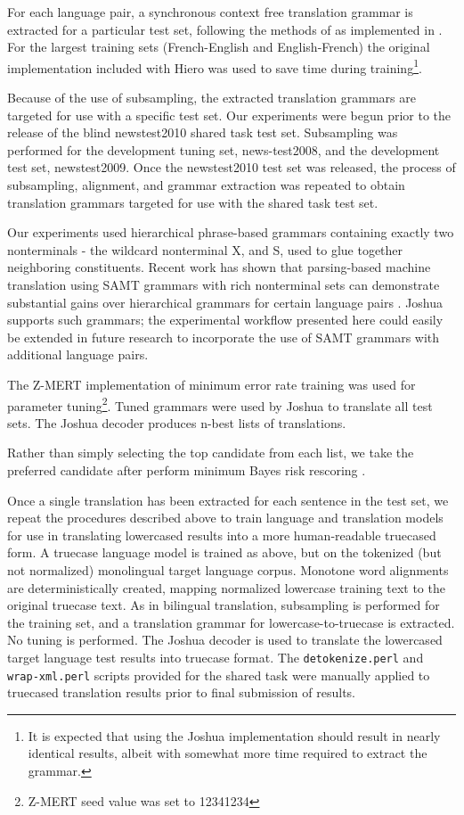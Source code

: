 \documentclass[11pt]{article}
\begin{document}
For each language pair, a synchronous context free translation grammar is extracted for a particular test set, following the methods of  as implemented in \cite{Schwartz-PBML}. For the largest training sets (French-English and English-French) the original \cite{Lopez2008} implementation included with Hiero was used to save time during training\footnote{It is expected that using the Joshua implementation should result in nearly identical results, albeit with somewhat more time required to extract the grammar.}.

Because of the use of subsampling, the extracted translation grammars are targeted for use with a specific test set. Our experiments were begun prior to the release of the blind newstest2010 shared task test set. Subsampling was performed for the development tuning set, news-test2008, and the development test set, newstest2009. Once the newstest2010 test set was released, the process of subsampling, alignment, and grammar extraction was repeated to obtain translation grammars targeted for use with the shared task test set. 

Our experiments used hierarchical phrase-based grammars containing exactly two nonterminals - the wildcard nonterminal X, and S, used to glue together neighboring constituents. Recent work has shown that parsing-based machine translation using SAMT \cite{samt2006} grammars with rich nonterminal sets can demonstrate substantial gains over hierarchical grammars for certain language pairs \cite{SCALE-report}. Joshua supports such grammars; the experimental workflow presented here could easily be extended in future research to incorporate the use of SAMT grammars with additional language pairs. 

The Z-MERT implementation \cite{Zaidan2009} of minimum error rate training \cite{Och2003c} was used for parameter tuning\footnote{Z-MERT seed value was set to 12341234}. Tuned grammars were used by Joshua to translate all test sets. The Joshua decoder produces n-best lists of translations. 

Rather than simply selecting the top candidate from each list, we take the preferred candidate after perform minimum Bayes risk rescoring \cite{Kumar2004b}.

Once a single translation has been extracted for each sentence in the test set, we repeat the procedures described above to train language and translation models for use in translating lowercased results into a more human-readable truecased form. A truecase language model is trained as above, but on the tokenized (but not normalized) monolingual target language corpus. Monotone word alignments are deterministically created, mapping normalized lowercase training text to the original truecase text. As in bilingual translation, subsampling is performed for the training set, and a translation grammar for lowercase-to-truecase is extracted. No tuning is performed. The Joshua decoder is used to translate the lowercased target language test results into truecase format. The {\tt detokenize.perl} and {\tt wrap-xml.perl} scripts provided for the shared task were manually applied to truecased translation results prior to final submission of results.
\end{document}
